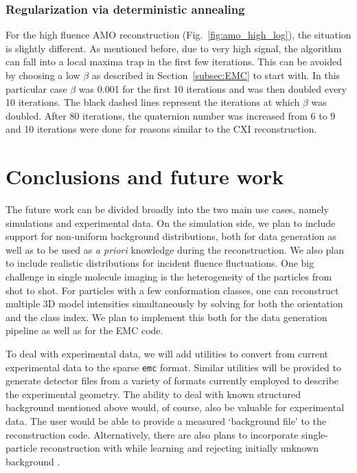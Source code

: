 \documentclass[]{iucr}              %
\begin{document}
\subsubsection{Regularization via deterministic annealing} \label{subsec:regularization}
For the high fluence AMO reconstruction (Fig.~\ref{fig:amo_high_log}), the situation is slightly different. As mentioned before, due to very high signal, the algorithm can fall into a local maxima trap in the first few iterations. This can be avoided by choosing a low $\beta$ as described in Section~\ref{subsec:EMC} to start with. In this particular case $\beta$ was 0.001 for the first 10 iterations and was then doubled every 10 iterations. The black dashed lines represent the iterations at which $\beta$ was doubled. After 80 iterations, the quaternion number was increased from 6 to 9 and 10 iterations were done for reasons similar to the CXI reconstruction. 

     
\section{Conclusions and future work}

The future work can be divided broadly into the two main use cases, namely simulations and experimental data. On the simulation side, we plan to include support for non-uniform background distributions, both for data generation as well as to be used as \emph{a priori} knowledge during the reconstruction. We also plan to include realistic distributions for incident fluence fluctuations. One big challenge in single molecule imaging is the heterogeneity of the particles from shot to shot. For particles with a few conformation classes, one can reconstruct multiple 3D model intensities simultaneously by solving for both the orientation and the class index. We plan to implement this both for the data generation pipeline as well as for the EMC code.

To deal with experimental data, we will add utilities to convert from current experimental data to the sparse \texttt{emc} format. Similar utilities will be provided to generate detector files from a variety of formats currently employed to describe the experimental geometry. The ability to deal with known structured background mentioned above would, of course, also be valuable for experimental data. The user would be able to provide a measured `background file' to the reconstruction code. Alternatively, there are also plans to incorporate single-particle reconstruction with while learning and rejecting initially unknown background \cite{Loh2014}.
\end{document}
